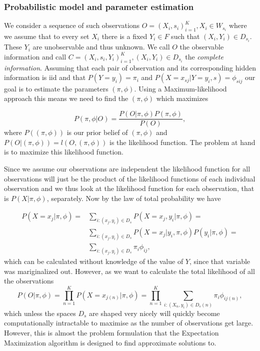 \subsubsection{Probabilistic model and parameter estimation}
We consider a sequence of such observations $O=(X_i, s_i)_{i=1}^K, X_i\in W_{s_i}$ where we assume that to every set $X_i$ there is a fixed $Y_i\in F$ such that $(X_i,Y_i)\in D_{s_i}$. These $Y_i$ are unobservable and thus unknown. We call $O$ the observable information and call $C = (X_i,s_i, Y_i)_{i=1}^K, (X_i,Y_i)\in D_{s_i}$ the \emph{complete information}. Assuming that each pair of observation and its corresponding hidden information is iid and that $P(Y=y_i)=\pi_i$ and $P(X=x_{sj} | Y=y_i, s) = \phi_{sij}$ our goal is to estimate the parameters $(\pi, \phi)$. Using a Maximum-likelihood approach this means we need to find the $(\pi, \phi)$ which maximizes 

\begin{equation*}
P(\pi, \phi | O)=\frac{P(O | \pi, \phi)P(\pi, \phi)}{P(O)},
\end{equation*}
where $P((\pi, \phi))$ is our prior belief of $(\pi, \phi)$ and $P(O | (\pi, \phi)) = l(O,(\pi, \phi))$ is the likelihood function. The problem at hand is to maximize this likelihood function.

Since we assume our observations are independent the likelihood function for all observations will just be the product of the likelihood functions of each individual observation and we thus look at the likelihood function for each observation, that is $P(X | \pi, \phi)$, separately. Now by the law of total probability we have 

\begin{equation*}
\begin{split}
P(X=x_j | \pi, \phi) = &\sum_{i:(x_j,y_i)\in D_s}P(X=x_j,y_i | \pi, \phi) = \\
&\sum_{i:(x_j,y_i)\in D_s} P(X=x_j|y_i , \pi, \phi)P(y_i | \pi, \phi) = \\
&\sum_{i:(x_j,y_i)\in D_s}\pi_i\phi_{ij},
\end{split}
\end{equation*}
which can be calculated without knowledge of the value of $Y$, since that variable was mariginalized out. However, as we want to calculate the total likelihood of all the observations 
\begin{equation*}
P(O | \pi, \phi) = \prod_{n=1}^K P(X=x_{j(n)} |\pi, \phi) = \prod_{n=1}^K \sum_{i:(X_n,y_i)\in D_s(n)} \pi_i\phi_{ij(n)},
\end{equation*}
which unless the spaces $D_s$ are shaped very nicely will quickly become computationally intractable to maximise as the number of observations get large. However, this is almost the problem formulation that the Expectation Maximization algorithm is designed to find approximate solutions to.

